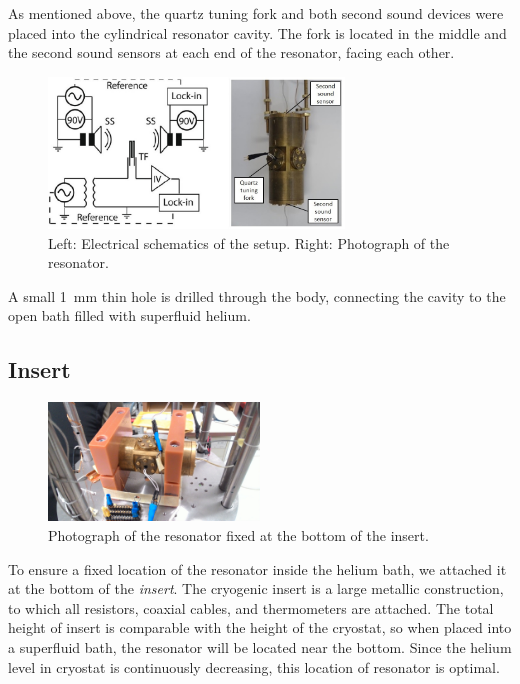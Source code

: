 As mentioned above, the quartz tuning fork and both second sound devices were placed into the cylindrical resonator cavity. The fork is located in the middle and the second sound sensors at each end of the resonator, facing each other. 

\begin{figure}[h]
	\centering
	\includegraphics[width=0.7\textwidth]{graphics/setup}
	\caption{Left: Electrical schematics of the setup. Right: Photograph of the resonator.}
\end{figure}

A small 1~mm thin hole is drilled through the body, connecting the cavity to the open bath filled with superfluid helium.

\subsection*{Insert}

\begin{figure}
	\centering
	\vspace{-0.5cm}
	\includegraphics[width=0.5\textwidth]{graphics/photo_insert2}
	\caption{Photograph of the resonator fixed at the bottom of the insert.}
	\vspace{0cm}	
\end{figure}

To ensure a fixed location of the resonator inside the helium bath, we attached it at the bottom of the \textit{insert}. The cryogenic insert is a large metallic construction, to which all resistors, coaxial cables, and thermometers are attached. The total height of insert is comparable with the height of the cryostat, so when placed into a superfluid bath, the resonator will be located near the bottom. Since the helium level in cryostat is continuously decreasing, this location of resonator is optimal.


